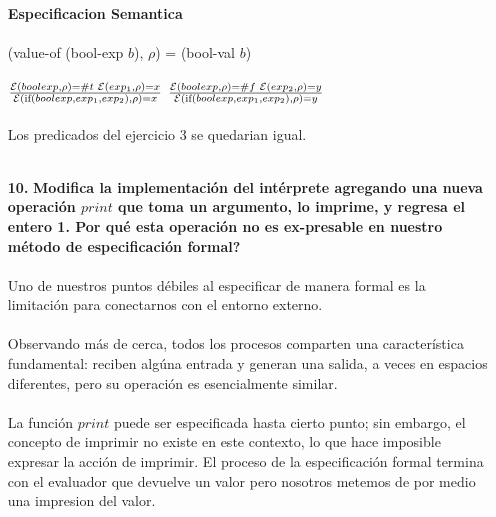 \documentclass{article}
\begin{document}
\begin{itemize}
    \\
    \textbf{Especificacion Semantica}\\
    \\
    \hspace*{10mm} (value-of (bool-exp $b$), $\rho$) = (bool-val $b$)\\
    \\
    \hspace*{10mm}
        $\frac
        {\mathcal{E}(boolexp,\rho)=\#t\hspace{1mm}\mathcal{E}(exp_1,\rho)=x}
        {\mathcal{E}(\text{if}(boolexp, exp_1, exp_2),\rho)=x}$
    \hspace*{10mm}
        $\frac
        {\mathcal{E}(boolexp,\rho)=\#f\hspace{1mm}\mathcal{E}(exp_2,\rho)=y}
        {\mathcal{E}(\text{if}(boolexp, exp_1, exp_2),\rho)=y}$\\
    \\
    \hspace*{10mm} Los predicados del ejercicio 3 se quedarian igual.\\
    \\
    \item[\textbf{10.}] \textbf{{\Large Modifica la implementación del intérprete agregando una nueva operación $print$ que toma un argumento, lo imprime, y regresa el entero 1. \textquestiondown Por qué esta operación no es ex-presable en nuestro método de especificación formal?}}\\
    \\
    Uno de nuestros puntos débiles al especificar de manera formal es la limitación para conectarnos con el entorno externo.\\
    \\
    Observando más de cerca, todos los procesos comparten una característica fundamental: reciben algúna entrada y generan una salida, a veces en espacios diferentes, pero su operación es esencialmente similar.\\
    \\
    La función $print$ puede ser especificada hasta cierto punto; sin embargo, el concepto de imprimir no existe en este contexto, lo que hace imposible expresar la acción de imprimir. El proceso de la especificación formal termina con el evaluador que devuelve un valor pero nosotros metemos de por medio una impresion del valor.


\end{itemize}
\end{document}
